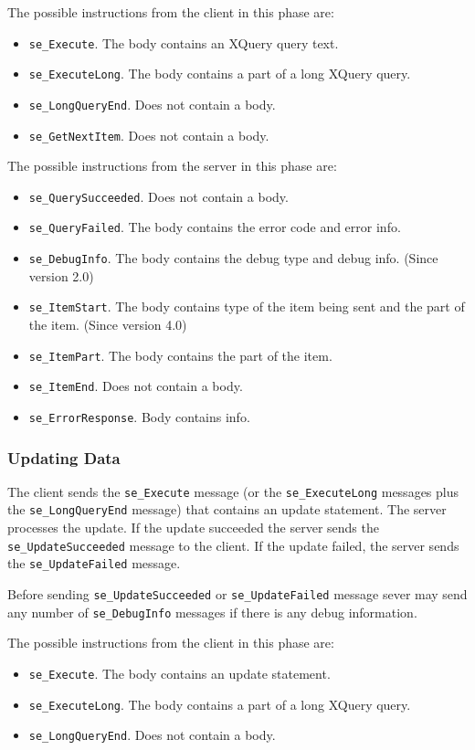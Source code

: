 \documentclass[a4paper,12pt]{article}
\begin{document}
The possible instructions from the client in this phase are:
\begin{itemize}
\item \verb!se_Execute!. The body contains an XQuery query text.
\item \verb!se_ExecuteLong!. The body contains a part of a long XQuery query.
\item \verb!se_LongQueryEnd!. Does not contain a body.
\item \verb!se_GetNextItem!. Does not contain a body.
\end{itemize}

The possible instructions from the server in this phase are:
\begin{itemize}
\item \verb!se_QuerySucceeded!. Does not contain a body.
\item \verb!se_QueryFailed!. The body contains the error code and error info.
\item \verb!se_DebugInfo!. The body contains the debug type and debug info. (Since version 2.0)
\item \verb!se_ItemStart!. The body contains type of the item being sent and the part of the item. (Since version 4.0)
\item \verb!se_ItemPart!. The body contains the part of the item.
\item \verb!se_ItemEnd!. Does not contain a body.
\item \verb!se_ErrorResponse!. Body contains info.
\end{itemize}

\subsubsection{Updating Data}

The client sends the \verb!se_Execute! message (or the \verb!se_ExecuteLong! messages plus the \verb!se_LongQueryEnd! message) that contains an update statement. The server processes the update. If the update succeeded the server sends the \verb!se_UpdateSucceeded! message to the client. If the update failed, the server sends the \verb!se_UpdateFailed! message.

Before sending \verb!se_UpdateSucceeded! or \verb!se_UpdateFailed! message sever may send any number of \verb!se_DebugInfo! messages if there is any debug information.

The possible instructions from the client in this phase are:
\begin{itemize}
\item \verb!se_Execute!. The body contains an update statement.
\item \verb!se_ExecuteLong!. The body contains a part of a long XQuery query.
\item \verb!se_LongQueryEnd!. Does not contain a body.
\end{itemize}
\end{document}
